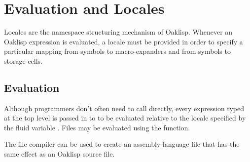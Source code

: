 %
%
%


\chapter{Evaluation and Locales} \label{locales}

Locales are the namespace structuring mechanism of Oaklisp.  Whenever
an Oaklisp expression is evaluated, a locale must be provided in order
to specify a particular mapping from symbols to macro-expanders and
from symbols to storage cells.

\section{Evaluation}


Although programmers don't often need to call  directly,
every expression typed at the top level is passed in to  to
be evaluated relative to the locale specified by the fluid variable
.  Files may be evaluated using the 
function.


The file compiler can be used to create an assembly language file that
has the same effect as an Oaklisp source file.

